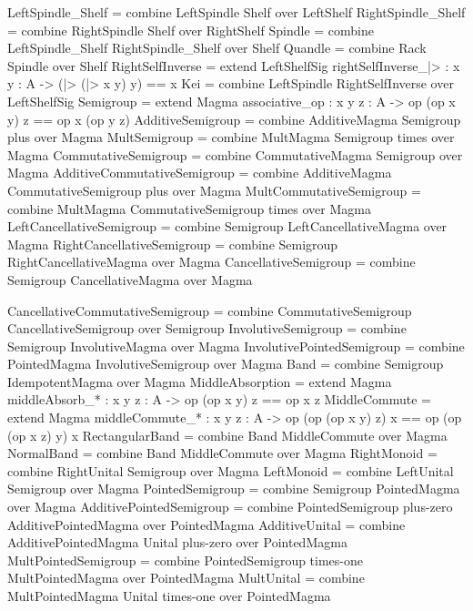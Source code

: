 \begin{togcode} 
LeftSpindle_Shelf = 
  combine LeftSpindle {} Shelf {} over LeftShelf 
RightSpindle_Shelf = 
  combine RightSpindle {} Shelf {} over RightShelf
Spindle = 
  combine LeftSpindle_Shelf {} RightSpindle_Shelf {} over Shelf 
Quandle = 
  combine Rack {} Spindle {} over Shelf 
RightSelfInverse = extend LeftShelfSig 
     {rightSelfInverse_|> : {x y : A} -> (|> (|> x y) y) == x}
Kei = combine LeftSpindle {} RightSelfInverse {} over LeftShelfSig
Semigroup = extend Magma 
     {associative_op : {x y z : A} -> op (op x y) z == op x (op y z)}
AdditiveSemigroup = combine AdditiveMagma {} Semigroup plus over Magma
MultSemigroup = combine MultMagma {} Semigroup times over Magma 
CommutativeSemigroup = 
  combine CommutativeMagma {} Semigroup {} over Magma 
AdditiveCommutativeSemigroup = 
  combine AdditiveMagma {} CommutativeSemigroup plus over Magma
MultCommutativeSemigroup = 
  combine MultMagma {} CommutativeSemigroup times over Magma  
  LeftCancellativeSemigroup = 
  combine Semigroup {} LeftCancellativeMagma {} over Magma
RightCancellativeSemigroup = 
  combine Semigroup {} RightCancellativeMagma {} over Magma  
CancellativeSemigroup = 
  combine Semigroup {} CancellativeMagma {} over Magma 
\end{togcode} 

\begin{togcode} 
CancellativeCommutativeSemigroup = 
  combine CommutativeSemigroup {} CancellativeSemigroup {} 
  over Semigroup
InvolutiveSemigroup = 
  combine Semigroup {} InvolutiveMagma {} over Magma
InvolutivePointedSemigroup = 
  combine PointedMagma{} InvolutiveSemigroup {} over Magma
Band = combine Semigroup {} IdempotentMagma {} over Magma
MiddleAbsorption = 
  extend Magma {middleAbsorb_* : {x y z : A} -> op (op x y) z == op x z}
MiddleCommute = 
  extend Magma {middleCommute_* : {x y z : A} -> 
       op (op (op x y) z) x == op (op (op x z) y) x}
RectangularBand = combine Band {} MiddleCommute {} over Magma
NormalBand = combine Band {} MiddleCommute {} over Magma
RightMonoid = combine RightUnital {} Semigroup {} over Magma
LeftMonoid  = combine LeftUnital {} Semigroup {} over Magma
PointedSemigroup = combine Semigroup {} PointedMagma {} over Magma 
AdditivePointedSemigroup = 
  combine PointedSemigroup plus-zero AdditivePointedMagma {} 
  over PointedMagma 
AdditiveUnital = 
  combine AdditivePointedMagma {} Unital plus-zero over PointedMagma 
MultPointedSemigroup = 
  combine PointedSemigroup times-one MultPointedMagma {} 
  over PointedMagma
MultUnital = 
  combine MultPointedMagma {} Unital times-one over PointedMagma    
\end{togcode} 


